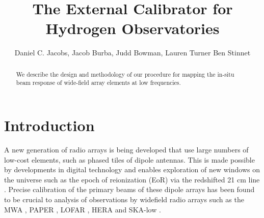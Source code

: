 \documentclass[preprint2,numberedappendix,tighten,twocolappendix]{aastex6}
\begin{document}
\title{The External Calibrator for Hydrogen Observatories}



\author{
Daniel C. Jacobs,
Jacob Burba,
Judd Bowman,
Lauren Turner
Ben Stinnet
}




\begin{abstract}
We describe the design and methodology of our procedure for mapping the in-situ beam response of wide-field array elements at low frequencies.  
\end{abstract}




\section{Introduction}\label{sec:intro}

A new generation of radio arrays is being developed that use large numbers of low-cost elements, such as phased tiles of dipole antennas. This is made possible by developments in digital technology and enables exploration of new windows on the universe such as the epoch of reionization (EoR) via the redshifted 21 cm line \citep{Morales:2010p8093,Furlanetto:2006p2267,Madau:1997p2232}. Precise calibration of the primary beams of these dipole arrays has been found to be crucial to analysis of observations by widefield radio arrays such as the MWA \citep{Tingay:2013p9022,Bowman:2013p9950}, PAPER \citep{Pober:2012p8800,2015ApJ...809...61A,2013ApJ...776..108J}, LOFAR \cite{Yatawatta:2013p9699}, HERA \citep{2016:deBoerHERAarxiv} and SKA-low \citep{Mellema:2013p10035,Mort:2016SKAlowimagingarxiv}.
\end{document}
